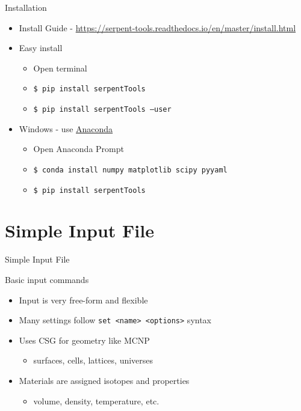 \documentclass{beamer}
\begin{document}
\begin{frame}{Installation}
    \begin{itemize}
        \item Install Guide - \url{https://serpent-tools.readthedocs.io/en/master/install.html}
        \item Easy install
            \begin{itemize}
                \item Open terminal
                \item \texttt{\$ pip install serpentTools}
                \item \texttt{\$ pip install serpentTools --user}
            \end{itemize}
        \item Windows - use \href{https://www.anaconda.com/distribution/}{Anaconda}
            \begin{itemize}
                \item Open Anaconda Prompt
                \item \texttt{\$ conda install numpy matplotlib scipy pyyaml}
                \item \texttt{\$ pip install serpentTools}
            \end{itemize}
    \end{itemize}
\end{frame}

\section{Simple Input File}

\begin{frame}{Simple Input File}
    \tableofcontents[sectionstyle=show/hide,subsectionstyle=show/show/hide]
\end{frame}

\begin{frame}{Basic input commands}
    \begin{itemize}
        \item Input is very free-form and flexible
        \item Many settings follow \texttt{set <name> <options>} syntax
        \item Uses CSG for geometry like MCNP
        \begin{itemize}
            \item surfaces, cells, lattices, universes
        \end{itemize}
        \item Materials are assigned isotopes and properties
        \begin{itemize}
            \item volume, density, temperature, etc.
        \end{itemize}
    \end{itemize}
\end{frame}
\end{document}
